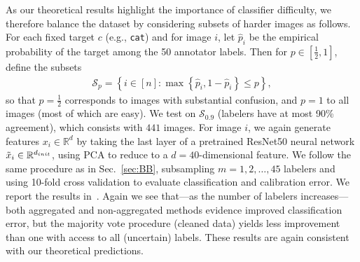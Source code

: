 \documentclass[11pt]{article}
\newcommand{\R}{\mathbb{R}} %
\newcommand{\what}[1]{\widehat{#1}}
\newcommand{\<}{\langle} %
\renewcommand{\>}{\rangle}
\begin{document}
As our theoretical results highlight the importance of classifier
difficulty, we therefore balance the dataset by considering subsets
of harder images as follows. For each fixed target $c$ (e.g., \texttt{cat})
and for image $i$, let $\what{p}_i$ be the empirical
probability of the target among the 50 annotator labels.
Then for $p \in [\frac{1}{2}, 1]$, define the subsets
\begin{align*}
  \mathcal{S}_p = \left\{i \in [n]
  : \max\left\{\what{p}_i, 1 - \what{p}_i\right\} \leq p\right\},
\end{align*}
so that $p = \frac{1}{2}$ corresponds to images with substantial confusion,
and $p = 1$ to all images (most of which are easy).  We test on
$\mathcal{S}_{0.9}$ (labelers have at most 90\% agreement), which consists
with $441$ images. For image $i$, we again generate features $x_i \in
\R^d$ by taking the last layer of a pretrained ResNet50 neural network
$\tilde{x}_i \in \R^{d_{\textup{init}}}$, using PCA to reduce
to a $d = 40$-dimensional feature.
We follow the same procedure as in Sec.~\ref{sec:BB}, subsampling
$m = 1, 2, \ldots, 45$ labelers and using 10-fold cross validation
to evaluate classification and calibration error.
We report the results
in~. Again we see that---as the number of labelers
increases---both aggregated and non-aggregated methods evidence improved
classification error, but the majority vote procedure (cleaned data) yields
less improvement than one with access to all (uncertain) labels.  These
results are again consistent with our theoretical predictions.

\end{document}

